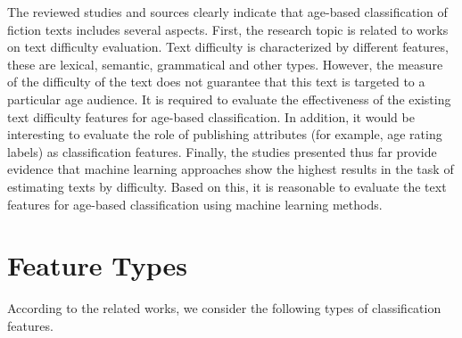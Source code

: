 \documentclass[runningheads]{llncs}
\begin{document}
The reviewed studies and sources clearly indicate that age-based classification of fiction texts includes several aspects. First, the research topic is related to works on text difficulty evaluation. Text difficulty is characterized by different features, these are lexical, semantic, grammatical and other types. However, the measure of the difficulty of the text does not guarantee that this text is targeted to a particular age audience. It is required to evaluate the effectiveness of the existing text difficulty features for age-based classification. In addition, it would be interesting to evaluate the role of publishing attributes (for example, age rating labels) as classification features. Finally, the studies presented thus far provide evidence that machine learning approaches show the highest results in the task of estimating texts by difficulty. Based on this, it is reasonable to evaluate the text features for age-based classification using machine learning methods.

\section{Feature Types}

According to the related works, we consider the following types of classification features.
\end{document}
